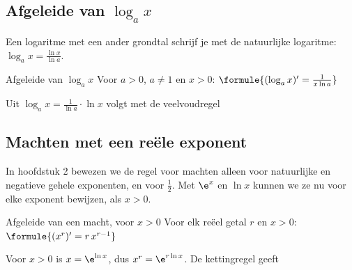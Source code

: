 \begin{oefeningen}
\end{oefeningen}

\subsection{Afgeleide van \texorpdfstring{$\log_a x$}{log x}}

Een logaritme met een ander grondtal schrijf je met de natuurlijke logaritme: $\log_a x = \frac{\ln x}{\ln a}$.

\begin{theorie}
\begin{stelling}{Afgeleide van \texorpdfstring{$\log_a x$}{log x}}
Voor $a > 0$, $a \neq 1$ en $x > 0$: \quad $\formule{(\log_a x)' = \frac{1}{x \ln a}}$
\end{stelling}
\begin{bewijs}
Uit $\log_a x = \frac{1}{\ln a} \cdot \ln x$ volgt met de veelvoudregel
\end{bewijs}
\end{theorie}


\begin{oefeningen}
\end{oefeningen}

\subsection{Machten met een reële exponent}

In hoofdstuk 2 bewezen we de regel voor machten alleen voor natuurlijke en negatieve gehele exponenten, en voor $\frac12$. Met $\e^x$ en $\ln x$ kunnen we ze nu voor elke exponent bewijzen, als $x > 0$.

\begin{theorie}
\begin{stelling}{Afgeleide van een macht, voor \texorpdfstring{$x > 0$}{x > 0}}
Voor elk reëel getal $r$ en $x > 0$: \quad $\formule{(x^r)' = r\,x^{r - 1}}$
\end{stelling}
\begin{bewijs}
Voor $x > 0$ is $x = \e^{\ln x}$, dus $x^r = \e^{r \ln x}$. De kettingregel geeft
\end{bewijs}
\end{theorie}

